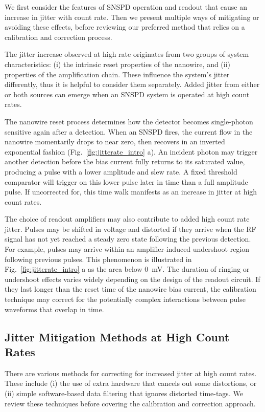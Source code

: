 \documentclass[11pt]{caltech_thesis} %
\begin{document}
We first consider the features of SNSPD operation and readout that cause
an increase in jitter with count rate. Then we present multiple ways of
mitigating or avoiding these effects, before reviewing our preferred
method that relies on a calibration and correction process.

The jitter increase observed at high rate originates from two groups of
system characteristics: (i) the intrinsic reset properties of the
nanowire, and (ii) properties of the amplification chain. These
influence the system's jitter differently, thus it is helpful to
consider them separately. Added jitter from either or both sources can
emerge when an SNSPD system is operated at high count rates.

The nanowire reset process determines how the detector becomes
single-photon sensitive again after a detection. When an SNSPD fires,
the current flow in the nanowire momentarily drops to near zero, then
recovers in an inverted exponential fashion
(Fig.~\ref{fig:jitterate_intro} a). An incident photon may trigger
another detection before the bias current fully returns to its saturated
value, producing a pulse with a lower amplitude and slew rate. A fixed
threshold comparator will trigger on this lower pulse later in time than
a full amplitude pulse. If uncorrected for, this time walk manifests as
an increase in jitter at high count rates.

The choice of readout amplifiers may also contribute to added high count
rate jitter. Pulses may be shifted in voltage and distorted if they
arrive when the RF signal has not yet reached a steady zero state
following the previous detection. For example, pulses may arrive within
an amplifier-induced undershoot region following previous pulses. This
phenomenon is illustrated in Fig.~\ref{fig:jitterate_intro} a as the
area below 0~mV. The duration of ringing or undershoot
effects varies widely depending on the design of the readout circuit. If
they last longer than the reset time of the nanowire bias current, the
calibration technique may correct for the potentially complex
interactions between pulse waveforms that overlap in time.

\hypertarget{jitter-mitigation-methods-at-high-count-rates}{%
\subsection{Jitter Mitigation Methods at High Count
Rates}\label{jitter-mitigation-methods-at-high-count-rates}}

There are various methods for correcting for increased jitter at high
count rates. These include (i) the use of extra hardware that cancels
out some distortions, or (ii) simple software-based data filtering that
ignores distorted time-tags. We review these techniques before covering
the calibration and correction approach.
\end{document}

